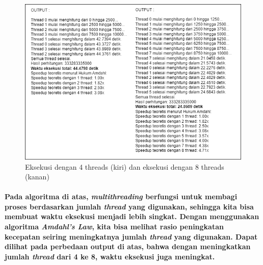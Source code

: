 \documentclass[12pt]{article}
\begin{document}
\begin{figure}[H]
    \centering
    \includegraphics[width=1\linewidth]{asset/31.png}
    \caption{Eksekusi dengan 4 threads (kiri) dan eksekusi dengan 8 threads (kanan)}
\end{figure}

\paragraph{
    \hspace*{1cm} Pada algoritma di atas, \textit{multithreading} berfungsi untuk membagi proses berdasarkan jumlah \textit{thread} yang digunakan, sehingga kita bisa membuat waktu eksekusi menjadi lebih singkat. Dengan menggunakan algoritma \textit{Amdahl's Law}, kita bisa melihat rasio peningkatan kecepatan seiring meningkatnya jumlah \textit{thread} yang digunakan. Dapat dilihat pada perbedaan output di atas, bahwa dengan meningkatkan jumlah \textit{thread} dari 4 ke 8, waktu eksekusi juga meningkat.
}
\end{document}
